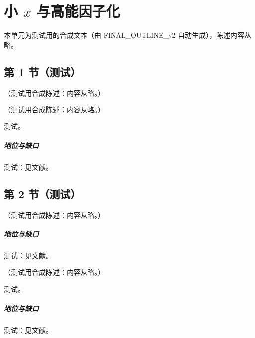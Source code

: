 \chapter{小 $x$ 与高能因子化}\label{ch:smallx}
本单元为测试用的合成文本（由 FINAL\_OUTLINE\_v2 自动生成），陈述内容从略。

\section{第 1 节（测试）}\label{sec:smallx-regge}

\begin{definition}[高能极限]\label{def:smallx-regge}
（测试用合成陈述：内容从略。）
\end{definition}

\begin{theorem}\label{thm:smallx-bfkl}
（测试用合成陈述：内容从略。）
\end{theorem}
\begin{proofsketch}测试。\end{proofsketch}
\paragraph{地位与缺口}测试：见文献。

\section{第 2 节（测试）}\label{sec:smallx-bfkl}

\begin{proposition}\label{prop:smallx-kt}
（测试用合成陈述：内容从略。）
\end{proposition}
\paragraph{地位与缺口}测试：见文献。

\begin{theorem}\label{thm:smallx-bk}
（测试用合成陈述：内容从略。）
\end{theorem}
\begin{proofsketch}测试。\end{proofsketch}
\paragraph{地位与缺口}测试：见文献。

